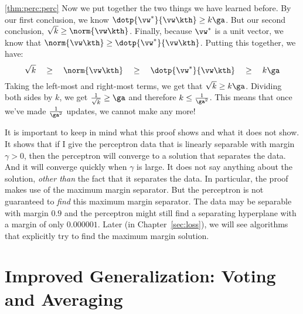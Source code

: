\begin{myproof}{\ref{thm:perc:perc}}
  Now we put together the two things we have learned before.  By our
  first conclusion, we know $\dotp{\vw^*}{\vw\kth} \geq k \ga$.  But
  our second conclusion, $\sqrt{k} \geq \norm{\vw\kth}$.  Finally,
  because $\vw^*$ is a unit vector, we know that $\norm{\vw\kth} \geq
  \dotp{\vw^*}{\vw\kth}$.  Putting this together, we have:
  \begin{equation}
    \sqrt k
    \quad\geq\quad
    \norm{\vw\kth}
    \quad\geq\quad
    \dotp{\vw^*}{\vw\kth}
    \quad\geq\quad
    k\ga
  \end{equation}
  Taking the left-most and right-most terms, we get that $\sqrt{k}
  \geq k \ga$.  Dividing both sides by $k$, we get $\frac 1 {\sqrt{k}}
  \geq \ga$ and therefore $k \leq \frac 1 {\ga^2}$.  This means
  that once we've made $\frac 1 {\ga^2}$ updates, we cannot make
  any more!
\end{myproof}


It is important to keep in mind what this proof shows and what it does
not show.  It shows that if I give the perceptron data that is
linearly separable with margin $\gamma > 0$, then the perceptron will
converge to a solution that separates the data.  And it will converge
quickly when $\gamma$ is large.  It does not say anything about the
solution, \emph{other than} the fact that it separates the data.  In
particular, the proof makes use of the maximum margin separator.  But
the perceptron is not guaranteed to \emph{find} this maximum margin
separator.  The data may be separable with margin $0.9$ and the
perceptron might still find a separating hyperplane with a margin of
only $0.000001$.  Later (in Chapter~\ref{sec:loss}), we will see
algorithms that explicitly try to find the maximum margin solution.


\section{Improved Generalization: Voting and Averaging}

